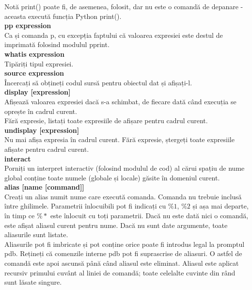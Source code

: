 \documentclass[oneside,20pt]{article}          %
\begin{document}
Notă print() poate fi, de asemenea, folosit, dar nu este o comandă de depanare - aceasta execută funcția Python print().\\
\textbf{pp expression}\\
Ca și comanda p, cu excepția faptului că valoarea expresiei este destul de imprimată folosind modulul pprint.\\
\textbf{
whatis expression}\\
Tipăriți tipul expresiei.\\
\textbf{
source expression}\\
Încercați să obțineți codul sursă pentru obiectul dat și afișați-l.\\

\textbf{display [expression]}\\
Afișează valoarea expresiei dacă s-a schimbat, de fiecare dată când execuția se oprește în cadrul curent.\\

Fără expresie, listați toate expresiile de afișare pentru cadrul curent.\\

\textbf{undisplay [expression]}\\
Nu mai afișa expresia în cadrul curent. Fără expresie, ștergeți toate expresiile afișate pentru cadrul curent.\\

\textbf{interact}\\
Porniți un interpret interactiv (folosind modulul de cod) al cărui spațiu de nume global conține toate numele (globale și locale) găsite în domeniul curent.\\

\textbf{alias [name [command]]}\\
Creați un alias numit nume care execută comanda. Comanda nu trebuie inclusă între ghilimele. Parametrii înlocuibili pot fi indicați cu $\%1$, $\%2$ și așa mai departe, în timp ce $\%*$ este înlocuit cu toți parametrii. Dacă nu este dată nici o comandă, este afișat aliasul curent pentru nume. Dacă nu sunt date argumente, toate aliasurile sunt listate.\\

Aliasurile pot fi imbricate și pot conține orice poate fi introdus legal la promptul pdb. Rețineți că comenzile interne pdb pot fi suprascrise de aliasuri. O astfel de comandă este apoi ascunsă până când aliasul este eliminat. Aliasul este aplicat recursiv primului cuvânt al liniei de comandă; toate celelalte cuvinte din rând sunt lăsate singure.\\
\end{document}
